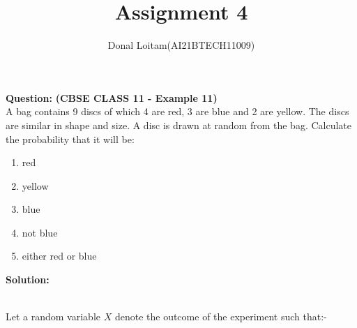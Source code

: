 \documentclass[journal,12pt,twocolumn]{IEEEtran}
\title{Assignment 4}
\author{Donal Loitam(AI21BTECH11009)}
\date{}
\newcommand{\question}{\noindent \textbf{Question: }}
\newcommand{\solution}{\noindent \textbf{Solution: }}
\begin{document}
\maketitle
\question \textbf{(CBSE CLASS 11 - Example 11)}\\
 A bag contains 9 discs of which 4 are red, 3 are blue and 2 are yellow.
The discs are similar in shape and size. A disc is drawn at random from the bag.
Calculate the probability that it will be:
\begin{enumerate}[label=(\roman{enumi})]
	\item red
	\item yellow
	\item blue
	\item not blue
	\item  either red or blue
\end{enumerate}
\solution
\begin{table}[ht!]
\begin{center}
		
		\vspace*{5pt}
		\caption{}
		\label{table:table1}
\end{center}	
	\end{table}\\
Let a random variable $X$ denote the outcome of the experiment such that:-
\begin{table}[ht!]
\begin{center}
		
		\vspace*{5pt}
		\caption{}
		\label{table:table1}
\end{center}	
	\end{table}\\
	
\end{document}
